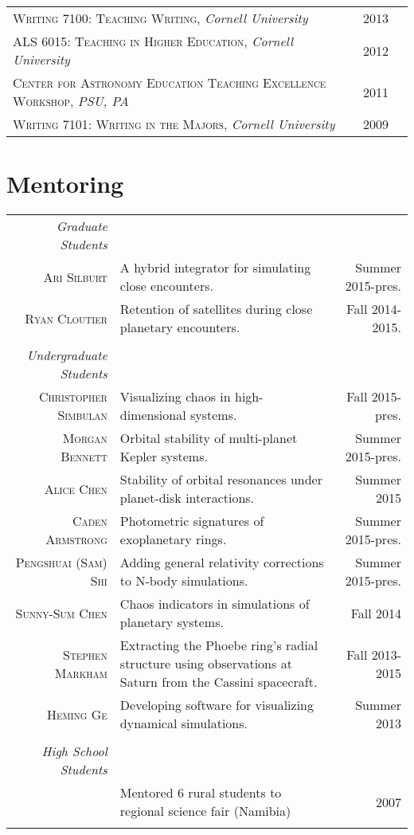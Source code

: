 \documentclass[10pt]{article} %
\begin{document}
\begin{tabular}{l>{\hfill}p{1.8cm}r}
\textsc{Writing 7100:  Teaching Writing}, {\it Cornell University} & 2013 \\
\textsc{ALS 6015:  Teaching in Higher Education}, {\it Cornell University} & 2012\\
\textsc{Center for Astronomy Education Teaching Excellence Workshop}, {\it PSU, PA} & 2011 \\
\textsc{Writing 7101: Writing in the Majors}, {\it Cornell University} & 2009 \\
\end{tabular}



\section{Mentoring}

\begin{tabular}{r|p{9.3cm}r}

{\it Graduate Students} \\
\textsc{Ari Silburt} & A hybrid integrator for simulating close encounters. & Summer 2015-pres. \\
\textsc{Ryan Cloutier} & Retention of satellites during close planetary encounters. & Fall 2014-2015. \\
\\
{\it Undergraduate Students} \\
\textsc{Christopher Simbulan} & Visualizing chaos in high-dimensional systems. & Fall 2015-pres. \\
\textsc{Morgan Bennett} & Orbital stability of multi-planet Kepler systems. & Summer 2015-pres. \\
\textsc{Alice Chen} & Stability of orbital resonances under planet-disk interactions. & Summer 2015 \\
\textsc{Caden Armstrong} & Photometric signatures of exoplanetary rings. & Summer 2015-pres. \\
\textsc{Pengshuai (Sam) Shi} & Adding general relativity corrections to N-body simulations. & Summer 2015-pres. \\
\textsc{Sunny-Sum Chen} & Chaos indicators in simulations of planetary systems. & Fall 2014 \\
\textsc{Stephen Markham} & Extracting the Phoebe ring's radial structure using observations at Saturn from the Cassini spacecraft. & Fall 2013-2015 \\
\textsc{Heming Ge} & Developing software for visualizing dynamical simulations. & Summer 2013 \\
\\
{\it High School Students} \\
& Mentored 6 rural students to regional science fair (Namibia) & 2007 \\
\multicolumn{3}{c}{} \\
\end{tabular}
\end{document}
